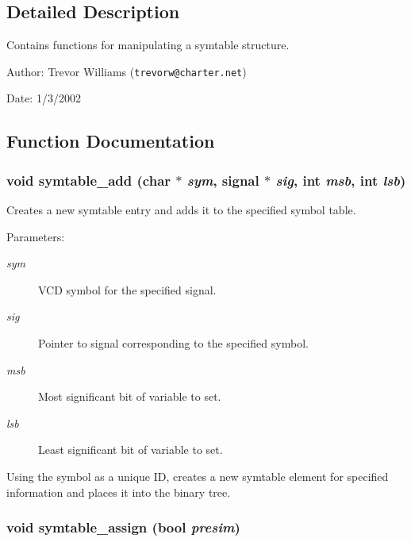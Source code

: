 \subsection{Detailed Description}
Contains functions for manipulating a symtable structure. 

\begin{Desc}
\item[Author:]Trevor Williams ({\tt trevorw@charter.net}) \end{Desc}
\begin{Desc}
\item[Date:]1/3/2002 \end{Desc}


\subsection{Function Documentation}
\subsubsection{\setlength{\rightskip}{0pt plus 5cm}void symtable\_\-add (char $\ast$ {\em sym}, {\bf signal} $\ast$ {\em sig}, int {\em msb}, int {\em lsb})}\label{symtable_8h_a1}


Creates a new symtable entry and adds it to the specified symbol table. 

\begin{Desc}
\item[Parameters:]
\begin{description}
\item[{\em sym}]VCD symbol for the specified signal. \item[{\em sig}]Pointer to signal corresponding to the specified symbol. \item[{\em msb}]Most significant bit of variable to set. \item[{\em lsb}]Least significant bit of variable to set.\end{description}
\end{Desc}
Using the symbol as a unique ID, creates a new symtable element for specified information and places it into the binary tree. 
\subsubsection{\setlength{\rightskip}{0pt plus 5cm}void symtable\_\-assign ({\bf bool} {\em presim})}\label{symtable_8h_a3}


